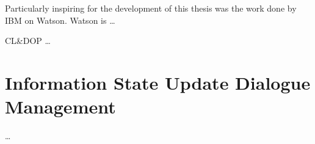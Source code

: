 Particularly inspiring for the development of this thesis was the work done by IBM on Watson. Watson is \ldots 

CL\&DOP \ldots


\section{Information State Update Dialogue Management}

\ldots